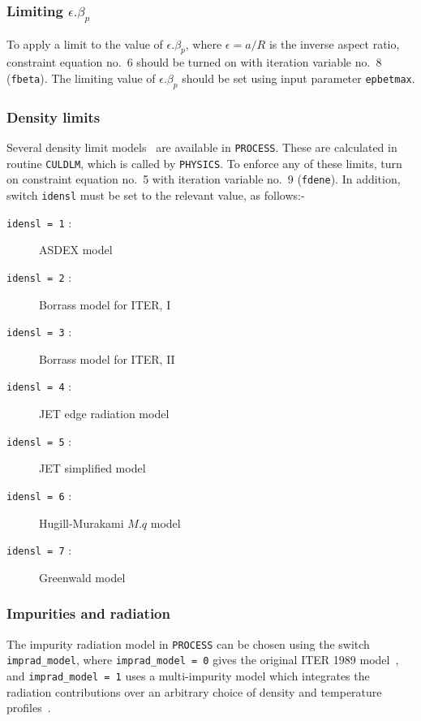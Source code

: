 \documentclass[11pt,a4paper]{report}
\newcommand{\process}{\mbox{\texttt{PROCESS}}}
\begin{document}
\subsubsection*{Limiting $\epsilon.\beta_p$}

To apply a limit to the value of $\epsilon.\beta_p$, where $\epsilon = a/R$ is
the inverse aspect ratio, constraint equation no.\ 6 should be turned on with
iteration variable no.\ 8 (\texttt{fbeta}). The limiting value of
$\epsilon.\beta_p$ should be set using input parameter \texttt{epbetmax}.

\subsubsection{Density limits}

Several density limit models~\cite{172} are available in \process. These are
calculated in routine \texttt{CULDLM}, which is called by \texttt{PHYSICS}.
To enforce any of these limits, turn on constraint equation no.~5 with
iteration variable no.~9 (\texttt{fdene}).  In addition, switch
\texttt{idensl} must be set to the relevant value, as follows:-
\begin{description} %
\item [\texttt{idensl = 1} :] ASDEX model
\item [\texttt{idensl = 2} :] Borrass model for ITER, I
\item [\texttt{idensl = 3} :] Borrass model for ITER, II
\item [\texttt{idensl = 4} :] JET edge radiation model
\item [\texttt{idensl = 5} :] JET simplified model
\item [\texttt{idensl = 6} :] Hugill-Murakami $M.q$ model
\item [\texttt{idensl = 7} :] Greenwald model
\end{description}

\subsubsection{Impurities and radiation}
\label{sec:radiation}

The impurity radiation model in \process\/ can be chosen using the switch
\texttt{imprad\_model}, where \texttt{imprad\_model = 0} gives the original
ITER 1989 model~\cite{kovari_physics}, and \texttt{imprad\_model = 1} uses a
multi-impurity model which integrates the radiation contributions over an
arbitrary choice of density and temperature profiles~\cite{hanni_radiation}.
\end{document}
